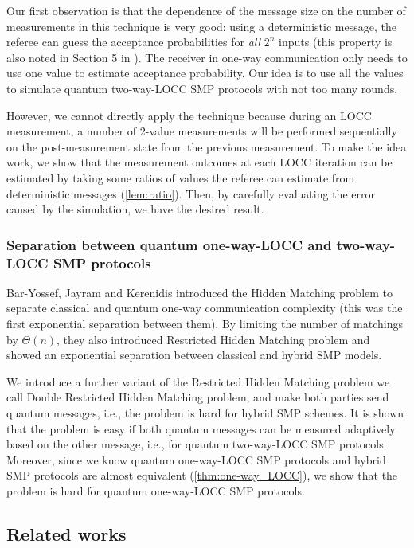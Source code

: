 Our first observation is that the dependence of the message size on the number of measurements in this technique is very good: using a deterministic message, the referee can guess the acceptance probabilities for \emph{all} $2^n$ inputs (this property is also noted in Section 5 in \cite{GRdW08}). The receiver in one-way communication only needs to use one value to estimate acceptance probability. Our idea is to use all the values to simulate quantum two-way-LOCC SMP protocols with not too many rounds.

However, we cannot directly apply the technique because during an LOCC measurement, a number of 2-value measurements will be performed sequentially on the post-measurement state from the previous measurement. To make the idea work, we show that the measurement outcomes at each LOCC iteration can be estimated by taking some ratios of values the referee can estimate from deterministic messages (\cref{lem:ratio}). Then, by carefully evaluating the error caused by the simulation, we have the desired result.

\subsubsection*{Separation between quantum one-way-LOCC and two-way-LOCC SMP protocols}

Bar-Yossef, Jayram and Kerenidis \cite{BYJK08} introduced the Hidden Matching problem to separate classical and quantum one-way communication complexity (this was the first exponential separation between them). By limiting the number of matchings by $\Theta(n)$, they also introduced Restricted Hidden Matching problem and showed an exponential separation between classical and hybrid SMP models.

We introduce a further variant of the Restricted Hidden Matching problem we call Double Restricted Hidden Matching problem, and make both parties send quantum messages, i.e., the problem is hard for hybrid SMP schemes. It is shown that the problem is easy if both quantum messages can be measured adaptively based on the other message, i.e., for quantum two-way-LOCC SMP protocols. Moreover, since we know quantum one-way-LOCC SMP protocols and hybrid SMP protocols are almost equivalent (\cref{thm:one-way_LOCC}), we show that the problem is hard for quantum one-way-LOCC SMP protocols.

\subsection{Related works}\label{sec:related}

